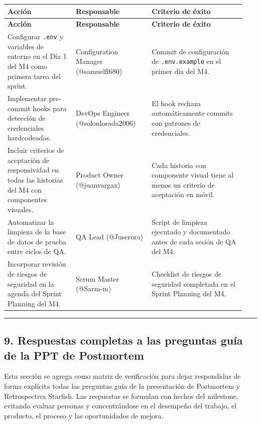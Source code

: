 \documentclass[11pt,a4paper]{article}
\begin{document}
\begingroup
\scriptsize
\setlength{\tabcolsep}{3pt}
\begin{longtable}{P{0.27\linewidth}P{0.30\linewidth}P{0.37\linewidth}}
\toprule
\textbf{Acción} & \textbf{Responsable} & \textbf{Criterio de éxito} \\
\midrule
\endfirsthead
\toprule
\textbf{Acción} & \textbf{Responsable} & \textbf{Criterio de éxito} \\
\midrule
\endhead
\bottomrule
\endlastfoot
Configurar \texttt{.env} y variables de entorno en el Día 1 del M4 como primera tarea del sprint. & Configuration Manager (@samuelfl680) & Commit de configuración de \texttt{.env.example} en el primer día del M4. \\
Implementar pre-commit hooks para detección de credenciales hardcodeadas. & DevOps Engineer (@solonlosada2006) & El hook rechaza automáticamente commits con patrones de credenciales. \\
Incluir criterios de aceptación de responsividad en todas las historias del M4 con componentes visuales. & Product Owner (@juanvargax) & Cada historia con componente visual tiene al menos un criterio de aceptación en móvil. \\
Automatizar la limpieza de la base de datos de prueba entre ciclos de QA. & QA Lead (@Juserora) & Script de limpieza ejecutado y documentado antes de cada sesión de QA del M4. \\
Incorporar revisión de riesgos de seguridad en la agenda del Sprint Planning del M4. & Scrum Master (@Sarm-m) & Checklist de riesgos de seguridad completada en el Sprint Planning del M4. \\
\end{longtable}
\endgroup

\vspace{0.6em}\hrule\vspace{0.8em}

\subsection{9. Respuestas completas a las preguntas guía de la PPT de Postmortem}

Esta sección se agrega como matriz de verificación para dejar respondidas de forma explícita todas las preguntas guía de la presentación de Postmortem y Retrospectiva Starfish. Las respuestas se formulan con hechos del milestone, evitando evaluar personas y concentrándose en el desempeño del trabajo, el producto, el proceso y las oportunidades de mejora.
\end{document}
